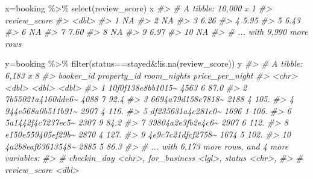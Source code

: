\documentclass[
]{article}
\newenvironment{Shaded}{\begin{snugshade}}{\end{snugshade}}
\newcommand{\CommentTok}[1]{\textcolor[rgb]{0.56,0.35,0.01}{\textit{#1}}}
\newcommand{\FunctionTok}[1]{\textcolor[rgb]{0.00,0.00,0.00}{#1}}
\newcommand{\NormalTok}[1]{#1}
\newcommand{\OtherTok}[1]{\textcolor[rgb]{0.56,0.35,0.01}{#1}}
\newcommand{\SpecialCharTok}[1]{\textcolor[rgb]{0.00,0.00,0.00}{#1}}
\newcommand{\StringTok}[1]{\textcolor[rgb]{0.31,0.60,0.02}{#1}}
\begin{document}
\begin{Shaded}
\begin{Highlighting}[]
\NormalTok{x}\OtherTok{=}\NormalTok{booking }\SpecialCharTok{\%\textgreater{}\%} 
  \FunctionTok{select}\NormalTok{(review\_score)}
\NormalTok{x  }
\CommentTok{\#\textgreater{} \# A tibble: 10,000 x 1}
\CommentTok{\#\textgreater{}    review\_score}
\CommentTok{\#\textgreater{}           \textless{}dbl\textgreater{}}
\CommentTok{\#\textgreater{}  1        NA   }
\CommentTok{\#\textgreater{}  2        NA   }
\CommentTok{\#\textgreater{}  3         6.26}
\CommentTok{\#\textgreater{}  4         5.95}
\CommentTok{\#\textgreater{}  5         6.43}
\CommentTok{\#\textgreater{}  6        NA   }
\CommentTok{\#\textgreater{}  7         7.60}
\CommentTok{\#\textgreater{}  8        NA   }
\CommentTok{\#\textgreater{}  9         6.97}
\CommentTok{\#\textgreater{} 10        NA   }
\CommentTok{\#\textgreater{} \# ... with 9,990 more rows}

\NormalTok{y}\OtherTok{=}\NormalTok{booking }\SpecialCharTok{\%\textgreater{}\%} 
  \FunctionTok{filter}\NormalTok{(status}\SpecialCharTok{==}\StringTok{\textquotesingle{}stayed\textquotesingle{}}\SpecialCharTok{\&!}\FunctionTok{is.na}\NormalTok{(review\_score))}
\NormalTok{y}
\CommentTok{\#\textgreater{} \# A tibble: 6,183 x 8}
\CommentTok{\#\textgreater{}    booker\_id         property\_id room\_nights price\_per\_night}
\CommentTok{\#\textgreater{}    \textless{}chr\textgreater{}                   \textless{}dbl\textgreater{}       \textless{}dbl\textgreater{}           \textless{}dbl\textgreater{}}
\CommentTok{\#\textgreater{}  1 10f0f138e8bb1015\textasciitilde{}        4563           6            87.0}
\CommentTok{\#\textgreater{}  2 7b55021a4160dde6\textasciitilde{}        4088           7            92.4}
\CommentTok{\#\textgreater{}  3 6694a79d158c7818\textasciitilde{}        2188           4           105. }
\CommentTok{\#\textgreater{}  4 944e568a0b511b91\textasciitilde{}        2907           4           116. }
\CommentTok{\#\textgreater{}  5 df235631a4c281c0\textasciitilde{}        1696           1           106. }
\CommentTok{\#\textgreater{}  6 5a1442f4c7237ec5\textasciitilde{}        2307           9            84.2}
\CommentTok{\#\textgreater{}  7 39804a2e3fb2e4c6\textasciitilde{}        2907           6           112. }
\CommentTok{\#\textgreater{}  8 e150e559405ef29b\textasciitilde{}        2870           4           127. }
\CommentTok{\#\textgreater{}  9 4e9c7c21dfcf2758\textasciitilde{}        1674           5           102. }
\CommentTok{\#\textgreater{} 10 4a2b8eaf63613548\textasciitilde{}        2885           5            86.3}
\CommentTok{\#\textgreater{} \# ... with 6,173 more rows, and 4 more variables:}
\CommentTok{\#\textgreater{} \#   checkin\_day \textless{}chr\textgreater{}, for\_business \textless{}lgl\textgreater{}, status \textless{}chr\textgreater{},}
\CommentTok{\#\textgreater{} \#   review\_score \textless{}dbl\textgreater{}}


\end{Highlighting}
\end{Shaded}
\end{document}
